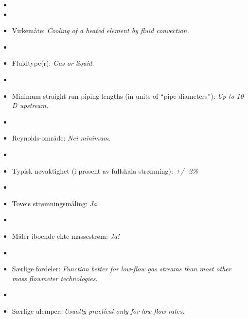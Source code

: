\begin{itemize}
\goodbreak
\item{} 
\vskip 5pt
\item\item{} Virkemåte: {\it Cooling of a heated element by fluid convection.}
\vskip 5pt
\item\item{} Fluidtype(r): {\it Gas or liquid.}
\vskip 5pt
\item\item{} Minimum straight-run piping lengths (in units of ``pipe diameters''): {\it Up to 10 D upstream.}
\vskip 5pt
\item\item{} Reynolds-område: {\it Nei minimum.}
\vskip 5pt
\item\item{} Typisk nøyaktighet (i prosent av fullskala strømning): {\it +/- 2\%}
\vskip 5pt
\item\item{} Toveis strømningsmåling: {\it Ja.}
\vskip 5pt
\item\item{} Måler iboende ekte massestrøm: {\it Ja!}
\vskip 5pt
\item\item{} Særlige fordeler: {\it Function better for low-flow gas streams than most other mass flowmeter technologies.}
\vskip 5pt
\item\item{} Særlige ulemper: {\it Usually practical only for low flow rates.}
\end{itemize}

